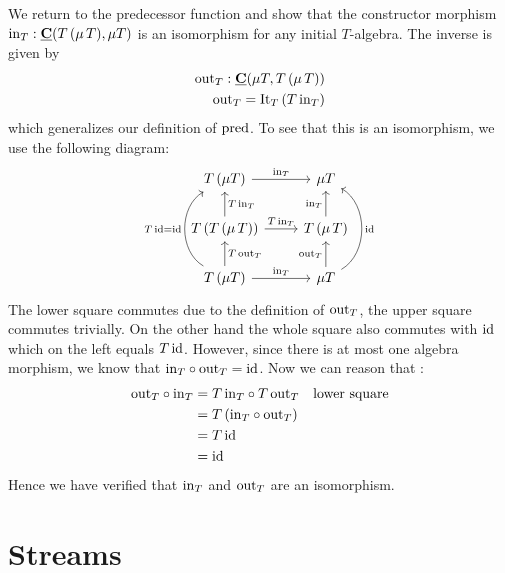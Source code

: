 We return to the predecessor function and show that the constructor morphism $\mathrm{in}_T : \underline{\mathbf{C}}(T\,(\mu\,T),\mu T)$ is an isomorphism for any initial $T$-algebra. The inverse is given by 
\begin{align*}
\mathrm{out}_T : \underline{\mathbf{C}}(\mu T,T\,(\mu\,T)) \\
\mathrm{out}_T = \mathrm{It}_T\,(T\,\mathrm{in}_T)
\end{align*}
which generalizes our definition of $\mathrm{pred}$. To see that this is an isomorphism, we use the following diagram:
\[\begin{tikzcd}
T\,(\mu T) \arrow[r,"\inn_T"] & \mu T\\
T\,(T\,(\mu\,T)) \arrow[r,"T\,\inn_T"]  \arrow[u,"T\,\inn_T" right]& T\,(\mu\,T) \arrow[u,"\inn_T" left]\\
T\,(\mu T) \arrow[u, "T\, \out_T" right]  \arrow[r,"\inn_T"] \arrow[uu,"T\,\id = \id",bend left = 60] & \mu T \arrow[u,"\out_T" left] \arrow[uu,"\id" right, bend right = 60]
\end{tikzcd}\]  
The lower square commutes due to the definition of $\mathrm{out}_T$, the upper square commutes trivially. On the other hand the whole square also commutes with $\mathrm{id}$ which on the left equals $T\,\mathrm{id}$. However, since there is at most one algebra morphism, we know that $\mathrm{in}_T \circ \mathrm{out}_T = \mathrm{id}$. Now we can reason that :
\begin{align*}
  \mathrm{out}_T \circ \mathrm{in}_T & = T\, \mathrm{in}_T \circ T\, \mathrm{out}_T & \mbox{lower square} \\
  & = T\,(\mathrm{in}_T \circ \mathrm{out}_T) \\
  & = T \, \mathrm{id} \\
  & = \mathrm{id}
\end{align*}
Hence we have verified that $\mathrm{in}_T$ and $\mathrm{out}_T$ are an isomorphism.

\section{Streams}
\label{sec:terminal-coalgebras}

